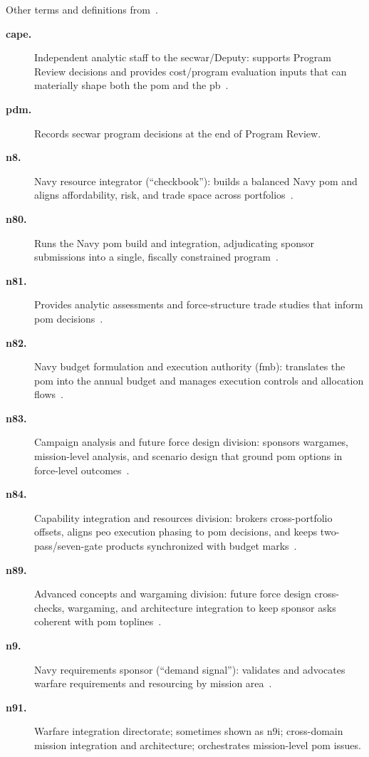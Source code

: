 \documentclass[../main.tex]{subfiles}
\begin{document}
Other terms and definitions from~\autocite{edo-3-1-1-ppbe-2025}.
\begin{description}
  \item[\textbf{\ac{cape}.}] Independent analytic staff to the \ac{secwar}/Deputy: supports Program Review decisions and provides cost/program evaluation inputs that can materially shape both the \ac{pom} and the \ac{pb}~\autocite{USC-139c-CAPE,edo-3-1-1-ppbe-2025}.
  \item[\textbf{\ac{pdm}.}] Records \ac{secwar} program decisions at the end of Program Review.
  \item[\textbf{\ac{n8}.}] Navy resource integrator (``checkbook''): builds a balanced Navy \ac{pom} and aligns affordability, risk, and trade space across portfolios~\autocite{edo-3-1-1-ppbe-2025}.
  \item[\textbf{\ac{n80}.}] Runs the Navy \ac{pom} build and integration, adjudicating sponsor submissions into a single, fiscally constrained program~\autocite{edo-3-1-1-ppbe-2025}.
  \item[\textbf{\ac{n81}.}] Provides analytic assessments and force-structure trade studies that inform \ac{pom} decisions~\autocite{edo-3-1-1-ppbe-2025}.
  \item[\textbf{\ac{n82}.}] Navy budget formulation and execution authority (\ac*{fmb}): translates the \ac{pom} into the annual budget and manages execution controls and allocation flows~\autocite{edo-3-1-1-ppbe-2025,edo-3-1-4-budget-execution-2025}.
  \item[\textbf{\ac{n83}.}] Campaign analysis and future force design division: sponsors wargames, mission-level analysis, and scenario design that ground \ac{pom} options in force-level outcomes~\autocite{edo-3-1-1-ppbe-2025}.
  \item[\textbf{\ac{n84}.}] Capability integration and resources division: brokers cross-portfolio offsets, aligns \ac{peo} execution phasing to \ac{pom} decisions, and keeps two-pass/seven-gate products synchronized with budget marks~\autocite{edo-3-1-1-ppbe-2025}.
  \item[\textbf{\ac{n89}.}] Advanced concepts and wargaming division: future force design cross-checks, wargaming, and architecture integration to keep sponsor asks coherent with \ac{pom} toplines~\autocite{edo-3-1-1-ppbe-2025}.
  \item[\textbf{\ac{n9}.}] Navy requirements sponsor (``demand signal''): validates and advocates warfare requirements and resourcing by mission area~\autocite{edo-3-1-1-ppbe-2025}.
  \item[\textbf{\ac{n91}.}] Warfare integration directorate; sometimes shown as \ac{n9i}; cross-domain mission integration and architecture; orchestrates mission-level \ac{pom} issues.

\end{description}
\end{document}
